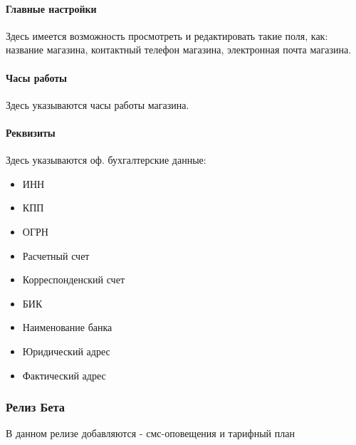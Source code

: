 \documentclass[DIV=calc, paper=a4, fontsize=11pt]{scrartcl} %
\begin{document}
\paragraph{Главные настройки}
Здесь имеется возможность просмотреть и редактировать такие поля, как: название магазина, контактный телефон магазина, электронная почта магазина.

\paragraph{Часы работы}
Здесь указываются часы работы магазина.

\paragraph{Реквизиты}
Здесь указываются оф. бухгалтерские данные:

\begin{itemize}
	\item ИНН
	\item КПП
	\item ОГРН
	\item Расчетный счет
	\item Корреспонденский счет
	\item БИК
	\item Наименование банка
	\item Юридический адрес
	\item Фактический адрес
\end{itemize}

\subsubsection{Релиз Бета}

В данном релизе добавляются - смс-оповещения и тарифный план 
\end{document}
